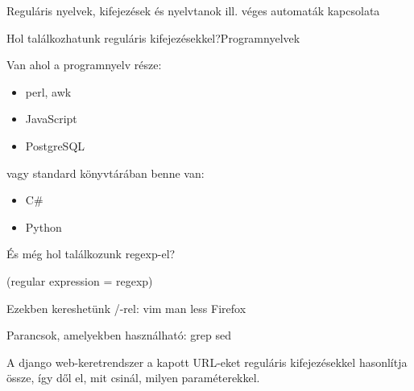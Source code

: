 \documentclass[
    ignorenonframetext
    ]{beamer}
\begin{document}
\begin{frame}
    {Reguláris nyelvek, kifejezések és nyelvtanok ill. véges automaták
    kapcsolata}

\end{frame}

\begin{frame}[fragile]
    {Hol találkozhatunk reguláris kifejezésekkel?}{Programnyelvek}

    Van ahol a programnyelv része:

    \begin{itemize}
        \item perl, awk
        \item JavaScript
        \item PostgreSQL
    \end{itemize}

    \vfill
    vagy standard könyvtárában benne van:
    \begin{itemize}
        \item C\#
        \item Python
    \end{itemize}
\end{frame}

\begin{frame}[fragile]
    {És még hol találkozunk regexp-el?}

    (regular expression = regexp)

    \vfill
    Ezekben kereshetünk /-rel: vim man less Firefox

    \vfill
    Parancsok, amelyekben használható: grep sed

    \vfill
    A \alert{django} web-keretrendszer a kapott URL-eket reguláris
    kifejezésekkel hasonlítja össze, így dől el, mit csinál, milyen
    paraméterekkel.
\end{frame}
\end{document}

